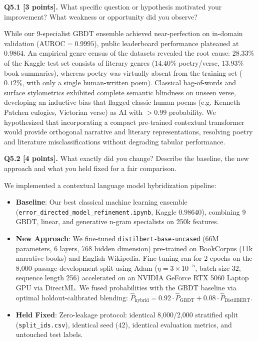 \documentclass[11pt,letterpaper]{article}
\begin{document}
\vspace{6pt}
\textbf{Q5.1 [3 points].} What specific question or hypothesis motivated your improvement? What weakness or opportunity did you observe?

While our 9-specialist GBDT ensemble achieved near-perfection on in-domain validation ($\text{AUROC} = 0.9995$), public leaderboard performance plateaued at $0.9864$. An empirical genre census of the datasets revealed the root cause: $28.33\%$ of the Kaggle test set consists of literary genres ($14.40\%$ poetry/verse, $13.93\%$ book summaries), whereas poetry was virtually absent from the training set ($0.12\%$, with only a single human-written poem). Classical bag-of-words and surface stylometrics exhibited complete semantic blindness on unseen verse, developing an inductive bias that flagged classic human poems (e.g. Kenneth Patchen eulogies, Victorian verse) as AI with $>0.99$ probability. We hypothesized that incorporating a compact pre-trained contextual transformer would provide orthogonal narrative and literary representations, resolving poetry and literature misclassifications without degrading tabular performance.

\vspace{6pt}
\textbf{Q5.2 [4 points].} What exactly did you change? Describe the baseline, the new approach and what you held fixed for a fair comparison.

We implemented a contextual language model hybridization pipeline:
\begin{itemize}[leftmargin=*,itemsep=1pt]
    \item \textbf{Baseline}: Our best classical machine learning ensemble (\texttt{error\_directed\_model\_refinement.ipynb}, Kaggle $0.98640$), combining 9 GBDT, linear, and generative n-gram specialists on 250k features.
    \item \textbf{New Approach}: We fine-tuned \texttt{distilbert-base-uncased} (66M parameters, 6 layers, 768 hidden dimension) pre-trained on BookCorpus (11k narrative books) and English Wikipedia. Fine-tuning ran for 2 epochs on the 8,000-passage development split using Adam ($\eta = 3\times 10^{-5}$, batch size 32, sequence length 256) accelerated on an NVIDIA GeForce RTX 5060 Laptop GPU via DirectML. We fused probabilities with the GBDT baseline via optimal holdout-calibrated blending: $\hat{P}_{\text{hybrid}} = 0.92 \cdot \hat{P}_{\text{GBDT}} + 0.08 \cdot \hat{P}_{\text{DistilBERT}}$.
    \item \textbf{Held Fixed}: Zero-leakage protocol: identical 8,000/2,000 stratified split (\texttt{split\_ids.csv}), identical seed ($42$), identical evaluation metrics, and untouched test labels.
\end{itemize}
\end{document}

